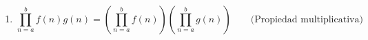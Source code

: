 \begin{enumerate}[label=\alph*)]
\begin{proof}
\begin{enumerate}[label=\Roman*)]
          \item Supongamos que si $b-a=k$, entonces
          \begin{align*}
            \prod_{n=a}^{b} f(n) &= f(b) \cdot \prod_{n=a}^{b-1} f(n)
          \end{align*}

          \item Notemos que si $b-a=k+1$, se tiene que
          \begin{align*}
            \prod_{n=a}^{a+k+1} f(n) &= f(a) \cdot \prod_{n=a+1}^{a+k+1} f(n) && \text{Definición}\\
            &= f(a) \cdot f(a+k+1) \cdot \prod_{n=a+1}^{a+k} f(n) && \text{Hip. Ind.}\\
            &= f(a+k+1) \cdot f(a) \cdot \prod_{n=a+1}^{a+k} f(n)\\
            &= f(a+k+1) \cdot \prod_{n=a}^{a+k} f(n) && \text{Definición}\\
            &= f(b) \cdot \prod_{n=a}^{b-1} f(n)
          \end{align*}
        \end{enumerate}
    \end{proof}
    
    \item \[\prod_{n=a}^{b} f(n) g(n) = \left(\prod_{n=a}^{b} f(n)\right) \left(\prod_{n=a}^{b} g(n)\right) \qquad \text{(Propiedad multiplicativa)}\]
    

\end{enumerate}

